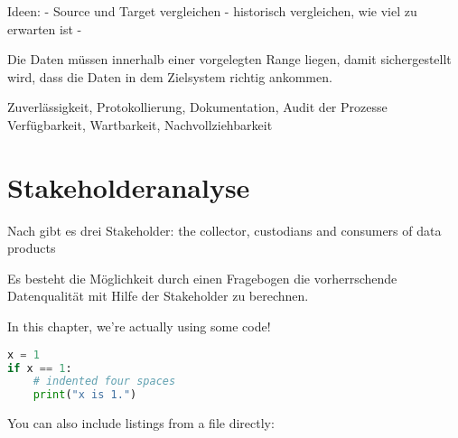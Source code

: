 Ideen:
- Source und Target vergleichen
- historisch vergleichen, wie viel zu erwarten ist
- 

Die Daten müssen innerhalb einer vorgelegten Range liegen, damit sichergestellt wird, dass die Daten in dem Zielsystem richtig ankommen.



Zuverlässigkeit, Protokollierung, Dokumentation, Audit der Prozesse
 Verfügbarkeit, Wartbarkeit, Nachvollziehbarkeit


\section{Stakeholderanalyse}
Nach \cite{pipino2002} gibt es drei Stakeholder: the collector, custodians and consumers of data products

Es besteht die Möglichkeit durch einen Fragebogen die vorherrschende Datenqualität mit Hilfe der Stakeholder zu berechnen. \cite{pipino2002}


In this chapter, we're actually using some code!

\begin{lstlisting}[language=Python,caption={This is an example of inline listing},captionpos=b]
x = 1
if x == 1:
    # indented four spaces
    print("x is 1.")

\end{lstlisting}

You can also include listings from a file directly:


